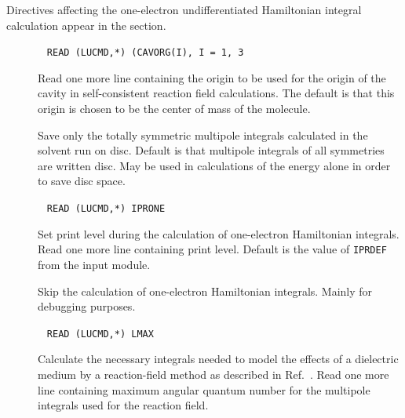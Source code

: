 Directives affecting the one-electron undifferentiated Hamiltonian
integral calculation appear in the  section.
\begin{description}
\item[]\verb| |\newline
\verb|READ (LUCMD,*) (CAVORG(I), I = 1, 3|

Read one more line containing the origin to be used for the origin of
the cavity in self-consistent reaction field
calculations. The default
is that this origin is chosen to be the center of mass of the molecule.

\item[] Save only the totally symmetric multipole integrals
calculated in the solvent run on disc. Default is that multipole
integrals of all symmetries are written disc. May be used in
calculations of the energy alone in order to save disc space.

\item[]\verb| |\newline
\verb|READ (LUCMD,*) IPRONE|

Set print level during the calculation of one-electron Hamiltonian
integrals.  Read one more line containing print level. Default is
the value of \verb|IPRDEF| from the  input module.

\item[] Skip the calculation of one-electron Hamiltonian
integrals. Mainly for debugging purposes.

\item[]\verb| |\newline
\verb|READ (LUCMD,*) LMAX|


Calculate the necessary integrals needed to model the effects of a
dielectric medium by a
reaction-field method as
described in
Ref.~\cite{kvmhahjajthjcp89}.  Read one more line containing maximum
angular quantum
number for the multipole integrals used for
the reaction field.
\end{description}

